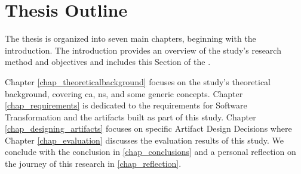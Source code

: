 \section{Thesis Outline} \label{sec_structure}

The thesis is organized into seven main chapters, beginning with the introduction. The
introduction provides an overview of the study's research method and objectives and
includes this Section of the .

Chapter \ref{chap_theoreticalbackground} focuses on the study's theoretical background,
covering \gls{ca}, \gls{ns}, and some generic concepts. Chapter \ref{chap_requirements} is
dedicated to the requirements for Software Transformation and the artifacts built as part
of this study. Chapter \ref{chap_designing_artifacts} focuses on specific Artifact Design
Decisions where Chapter \ref{chap_evaluation} discusses the evaluation results of this
study. We conclude with the conclusion in \ref{chap_conclusions} and a personal reflection
on the journey of this research in \ref{chap_reflection}.